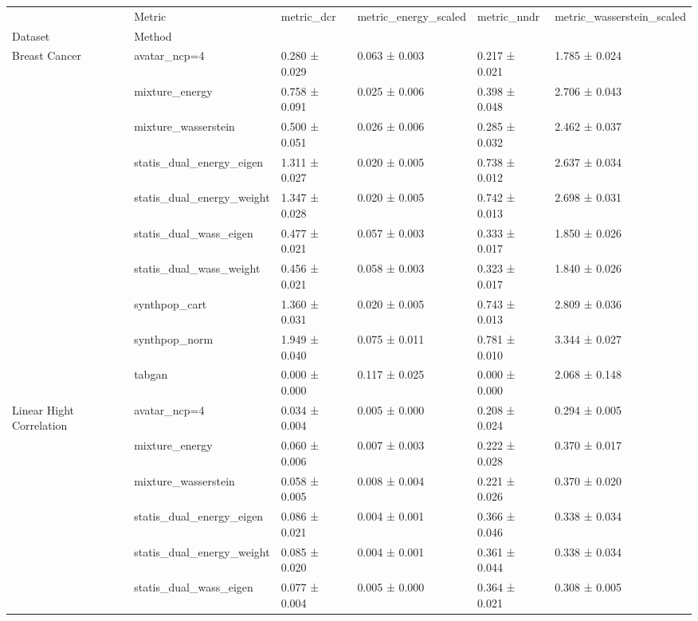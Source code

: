 \begin{tabular}{llllll}
\toprule
 & Metric & metric_dcr & metric_energy_scaled & metric_nndr & metric_wasserstein_scaled \\
Dataset & Method &  &  &  &  \\
\midrule
\multirow[t]{10}{*}{Breast Cancer} & avatar_ncp=4 & 0.280 ± 0.029 & 0.063 ± 0.003 & 0.217 ± 0.021 & \cellcolor{mygreen}1.785 ± 0.024 \\
 & mixture_energy & 0.758 ± 0.091 & 0.025 ± 0.006 & 0.398 ± 0.048 & 2.706 ± 0.043 \\
 & mixture_wasserstein & 0.500 ± 0.051 & 0.026 ± 0.006 & 0.285 ± 0.032 & 2.462 ± 0.037 \\
 & statis_dual_energy_eigen & 1.311 ± 0.027 & \cellcolor{mygreen}0.020 ± 0.005 & 0.738 ± 0.012 & 2.637 ± 0.034 \\
 & statis_dual_energy_weight & 1.347 ± 0.028 & \cellcolor{mygreen}0.020 ± 0.005 & 0.742 ± 0.013 & 2.698 ± 0.031 \\
 & statis_dual_wass_eigen & 0.477 ± 0.021 & 0.057 ± 0.003 & 0.333 ± 0.017 & 1.850 ± 0.026 \\
 & statis_dual_wass_weight & 0.456 ± 0.021 & 0.058 ± 0.003 & 0.323 ± 0.017 & 1.840 ± 0.026 \\
 & synthpop_cart & 1.360 ± 0.031 & \cellcolor{mygreen}0.020 ± 0.005 & 0.743 ± 0.013 & 2.809 ± 0.036 \\
 & synthpop_norm & \cellcolor{myred}1.949 ± 0.040 & 0.075 ± 0.011 & \cellcolor{myred}0.781 ± 0.010 & \cellcolor{myred}3.344 ± 0.027 \\
 & tabgan & \cellcolor{mygreen}0.000 ± 0.000 & \cellcolor{myred}0.117 ± 0.025 & \cellcolor{mygreen}0.000 ± 0.000 & 2.068 ± 0.148 \\
\cline{1-6}
\multirow[t]{10}{*}{Linear 
 Hight Correlation} & avatar_ncp=4 & 0.034 ± 0.004 & 0.005 ± 0.000 & 0.208 ± 0.024 & \cellcolor{mygreen}0.294 ± 0.005 \\
 & mixture_energy & 0.060 ± 0.006 & 0.007 ± 0.003 & 0.222 ± 0.028 & 0.370 ± 0.017 \\
 & mixture_wasserstein & 0.058 ± 0.005 & 0.008 ± 0.004 & 0.221 ± 0.026 & 0.370 ± 0.020 \\
 & statis_dual_energy_eigen & 0.086 ± 0.021 & \cellcolor{mygreen}0.004 ± 0.001 & 0.366 ± 0.046 & 0.338 ± 0.034 \\
 & statis_dual_energy_weight & 0.085 ± 0.020 & \cellcolor{mygreen}0.004 ± 0.001 & 0.361 ± 0.044 & 0.338 ± 0.034 \\
 & statis_dual_wass_eigen & 0.077 ± 0.004 & 0.005 ± 0.000 & 0.364 ± 0.021 & 0.308 ± 0.005 \\

\end{tabular}
